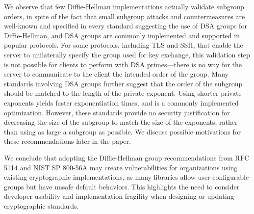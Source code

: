 We observe
that few Diffie-Hellman implementations actually validate subgroup orders, in spite of the fact
that small subgroup attacks and countermeasures are well-known and specified
in every standard suggesting the use of DSA groups for Diffie-Hellman, and DSA
groups are commonly implemented and supported in popular protocols. For some protocols, including
TLS and SSH, that enable the server to unilaterally specify the group used for
key exchange, this validation step is not possible for clients to perform with
DSA primes---there is no way for the server to communicate to the client the
intended order of the group. Many standards involving DSA groups further
suggest that the order of the subgroup should be matched to the length of the
private exponent.  Using shorter private exponents yields faster exponentiation
times, and is a commonly implemented optimization. However, these standards
provide no security justification for decreasing the size of the subgroup to
match the size of the exponents, rather than using as large a subgroup as
possible. We discuss possible motivations for these recommendations
later in the paper.

We conclude that adopting the Diffie-Hellman group recommendations from RFC
5114 and NIST SP 800-56A may create vulnerabilities for organizations using
existing cryptographic implementations, as many libraries allow
user-configurable groups but have unsafe default behaviors.  This highlights the
need to consider developer usability and implementation fragility when designing
or updating cryptographic standards.

